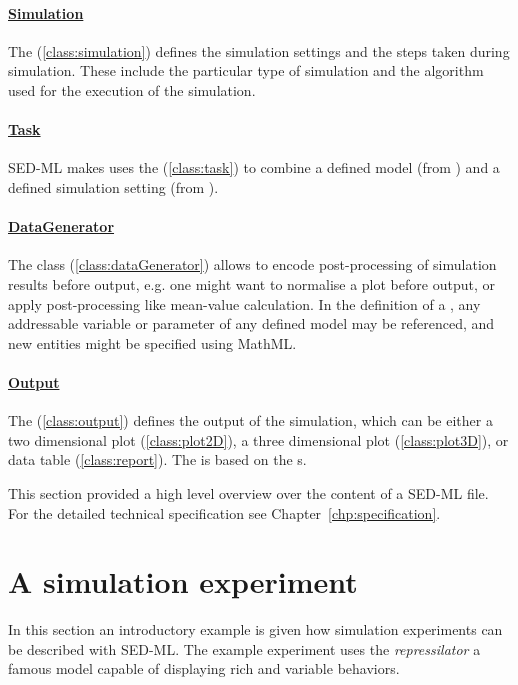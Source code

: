 \paragraph*{\hyperref[class:simulation]{Simulation}}
The  (\ref{class:simulation}) defines the simulation settings and the steps taken during simulation. These include the particular type of simulation and the algorithm used for the execution of the simulation.

\paragraph*{\hyperref[class:task]{Task}}
SED-ML makes uses the  (\ref{class:task}) to combine a defined model (from ) and a defined simulation setting (from ).

\paragraph*{\hyperref[class:dataGenerator]{DataGenerator}}
The  class (\ref{class:dataGenerator}) allows to encode post-processing of simulation results before output, e.g. one might want to normalise a plot before output, or apply post-processing like mean-value calculation. In the definition of a , any addressable variable or parameter of any defined model may be referenced, and new entities might be specified using MathML.

\paragraph*{\hyperref[class:output]{Output}}
The  (\ref{class:output}) defines the output of the simulation, which can be either a two dimensional plot  (\ref{class:plot2D}), a three dimensional plot  (\ref{class:plot3D}), or data table  (\ref{class:report}). The  is based on the s.

This section provided a high level overview over the content of a SED-ML file. For the detailed technical specification see Chapter~\ref{chp:specification}. 

\section{A simulation experiment}
\label{motivation:example}
In this section an introductory example is given how simulation experiments can be described with SED-ML. The example experiment uses the \emph{repressilator} \citep{Elowitz:2000} a famous model capable of displaying rich and variable behaviors.

